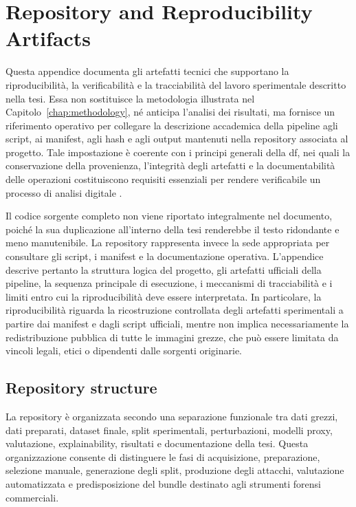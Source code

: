 \chapter{Repository and Reproducibility Artifacts}
\label{app:repository-reproducibility-artifacts}

Questa appendice documenta gli artefatti tecnici che supportano la riproducibilità, la verificabilità e la tracciabilità del lavoro sperimentale descritto nella tesi. Essa non sostituisce la metodologia illustrata nel Capitolo~\ref{chap:methodology}, né anticipa l'analisi dei risultati, ma fornisce un riferimento operativo per collegare la descrizione accademica della pipeline agli script, ai manifest, agli hash e agli output mantenuti nella repository associata al progetto. Tale impostazione è coerente con i principi generali della \gls{df}, nei quali la conservazione della provenienza, l'integrità degli artefatti e la documentabilità delle operazioni costituiscono requisiti essenziali per rendere verificabile un processo di analisi digitale \cite{casey2011digital,garfinkel2010digital,nist2006guide,iso27037}.

Il codice sorgente completo non viene riportato integralmente nel documento, poiché la sua duplicazione all'interno della tesi renderebbe il testo ridondante e meno manutenibile. La repository rappresenta invece la sede appropriata per consultare gli script, i manifest e la documentazione operativa. L'appendice descrive pertanto la struttura logica del progetto, gli artefatti ufficiali della pipeline, la sequenza principale di esecuzione, i meccanismi di tracciabilità e i limiti entro cui la riproducibilità deve essere interpretata. In particolare, la riproducibilità riguarda la ricostruzione controllata degli artefatti sperimentali a partire dai manifest e dagli script ufficiali, mentre non implica necessariamente la redistribuzione pubblica di tutte le immagini grezze, che può essere limitata da vincoli legali, etici o dipendenti dalle sorgenti originarie.

\section{Repository structure}
\label{app:repository-structure}

La repository è organizzata secondo una separazione funzionale tra dati grezzi, dati preparati, dataset finale, split sperimentali, perturbazioni, modelli proxy, valutazione, explainability, risultati e documentazione della tesi. Questa organizzazione consente di distinguere le fasi di acquisizione, preparazione, selezione manuale, generazione degli split, produzione degli attacchi, valutazione automatizzata e predisposizione del bundle destinato agli strumenti forensi commerciali.

